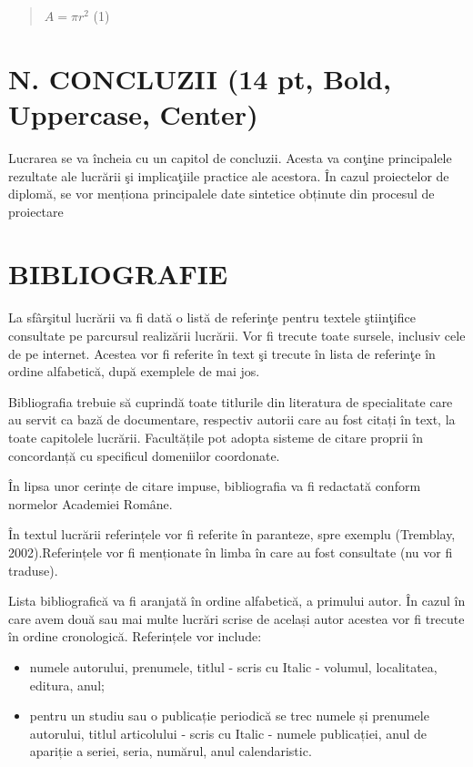 \documentclass[
]{article}
\begin{document}
\begin{quote}
\(A = \pi r^{2}\) (1)
\end{quote}

\hypertarget{n.-concluzii-14-pt-bold-uppercase-center}{%
\section{N. CONCLUZII (14 pt, Bold, Uppercase,
Center)}\label{n.-concluzii-14-pt-bold-uppercase-center}}

Lucrarea se va încheia cu un capitol de concluzii. Acesta va conţine
principalele rezultate ale lucrării şi implicaţiile practice ale
acestora. În cazul proiectelor de diplomă, se vor menționa principalele
date sintetice obținute din procesul de proiectare

\hypertarget{bibliografie}{%
\section{BIBLIOGRAFIE}\label{bibliografie}}

La sfârşitul lucrării va fi dată o listă de referinţe pentru textele
ştiinţifice consultate pe parcursul realizării lucrării. Vor fi trecute
toate sursele, inclusiv cele de pe internet. Acestea vor fi referite în
text şi trecute în lista de referinţe în ordine alfabetică, după
exemplele de mai jos.

Bibliografia trebuie să cuprindă toate titlurile din literatura de
specialitate care au servit ca bază de documentare, respectiv autorii
care au fost citați în text, la toate capitolele lucrării. Facultățile
pot adopta sisteme de citare proprii în concordanță cu specificul
domeniilor coordonate.

În lipsa unor cerințe de citare impuse, bibliografia va fi redactată
conform normelor Academiei Române.

În textul lucrării referințele vor fi referite în paranteze, spre
exemplu (Tremblay, 2002).Referințele vor fi menționate în limba în care
au fost consultate (nu vor fi traduse).

Lista bibliografică va fi aranjată în ordine alfabetică, a primului
autor. În cazul în care avem două sau mai multe lucrări scrise de
același autor acestea vor fi trecute în ordine cronologică. Referințele
vor include:

\begin{itemize}
\item
  numele autorului, prenumele, titlul - scris cu Italic - volumul,
  localitatea, editura, anul;
\item
  pentru un studiu sau o publicație periodică se trec numele și
  prenumele autorului, titlul articolului - scris cu Italic - numele
  publicației, anul de apariție a seriei, seria, numărul, anul
  calendaristic.
\end{itemize}
\end{document}
